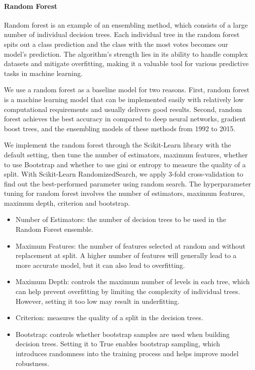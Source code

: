 \documentclass{article}
\begin{document}
\paragraph{Random Forest}
Random forest is an example of an ensembling method, which consists of a large number of individual decision trees. Each individual tree in the random forest spits out a class prediction and the class with the most votes becomes our model’s prediction. The algorithm’s strength lies in its ability to handle complex datasets and mitigate overfitting, making it a valuable tool for various predictive tasks in machine learning. 

We use a random forest as a baseline model for two reasons. First, random forest is a machine learning model that can be implemented easily with relatively low computational requirements and usually delivers good results. Second, random forest achieves the best accuracy in \cite{krauss2017deep} compared to deep neural networks, gradient boost trees, and the ensembling models of these methods from 1992 to 2015. 

We implement the random forest through the Scikit-Learn library with the default setting, then tune the number of estimators, maximum features, whether to use Bootstrap and whether to use gini or entropy to measure the quality of a split. With Scikit-Learn RandomizedSearch, we apply 3-fold cross-validation to find out the best-performed parameter using random search. The hyperparameter tuning for random forest involves the number of estimators, maximum features, maximum depth, criterion and bootstrap. 
\begin{itemize}
  \item Number of Estimators: the number of decision trees to be used in the Random Forest ensemble.
  \item Maximum Features: the number of features selected at random and without replacement at split. A higher number of features will generally lead to a more accurate model, but it can also lead to overfitting. 
  \item Maximum Depth: controls the maximum number of levels in each tree, which can help prevent overfitting by limiting the complexity of individual trees. However, setting it too low may result in underfitting. 
  \item Criterion: measures the quality of a split in the decision trees. 
  \item Bootstrap: controls whether bootstrap samples are used when building decision trees. Setting it to True enables bootstrap sampling, which introduces randomness into the training process and helps improve model robustness. 
\end{itemize}
\end{document}
